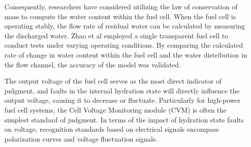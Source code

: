 \par
Consequently, researchers have considered utilizing the law of conservation of mass to compute the water content within the fuel cell. When the fuel cell is operating stably, the flow rate of residual water can be calculated by measuring the discharged water. Zhao et al\cite{zhaoStudyWaterTransport2021} employed a single transparent fuel cell to conduct tests under varying operating conditions.
By comparing the calculated rate of change in water content within the fuel cell and the water distribution in the flow channel, the accuracy of the model was validated.
\par
The output voltage of the fuel cell serves as the most direct indicator of judgment, and faults in the internal hydration state will directly influence the output voltage, causing it to decrease or fluctuate. Particularly for high-power fuel cell systems, the Cell Voltage Monitoring module (CVM) is often the simplest standard of judgment. In terms of the impact of hydration state faults on voltage, recognition standards based on electrical signals encompass polarization curves and voltage fluctuation signals.
